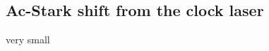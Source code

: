 \documentclass[bibnotes]{article}
\newcommand{\SLJ}[3]{{\ensuremath{{^{#1}}\mathrm{#2}_{#3}}}}
\newcommand{\SSZ}{\SLJ{1}{S}{0} \ }
\begin{document}



\subsection{Ac-Stark shift from the clock laser}
	very small

{}

\end{document}

